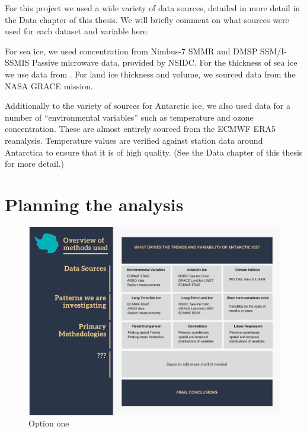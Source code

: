\documentclass[../main.tex]{subfiles}
\begin{document}
For this project we used a wide variety of data sources, detailed in more detail in the Data chapter of this thesis. We will briefly comment on what sources were used for each dataset and variable here.

For sea ice, we used concentration from Nimbus-7 SMMR and DMSP SSM/I-SSMIS Passive microwave data, provided by NSIDC. For the thickness of sea ice we use data from . For land ice thickness and volume, we sourced data from the NASA GRACE mission. 

Additionally to the variety of sources for Antarctic ice, we also used data for a number of ``environmental variables'' such as temperature and ozone concentration. These are almost entirely sourced from the ECMWF ERA5 reanalysis. Temperature values are verified against station data around Antarctica to ensure that it is of high quality. (See the Data chapter of this thesis for more detail.)

\section{Planning the analysis}
\begin{figure}[hbt!]
    \centering
    \includegraphics[width=\textwidth]{images/flowchart/Flowchart of analysis and methods.pdf}
    \caption{Option one}
    \label{fig:flowchart}
\end{figure}
\end{document}
